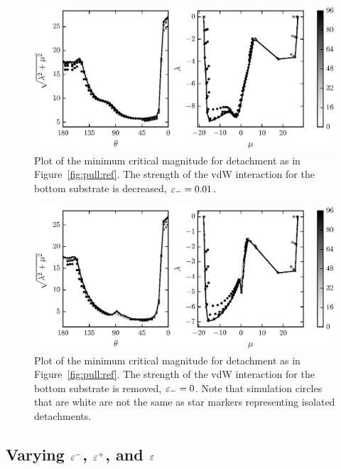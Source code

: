 {   \begin{figure}[t]
      \begin{center}
         \includegraphics{./fig/ch3/pull/eb0.01/grid.eps}
      \end{center}      
      \caption{Plot of the minimum critical magnitude for detachment as in Figure~\ref{fig:pull:ref}. The strength of the vdW interaction for the bottom substrate is decreased, $\varepsilon_-=0.01$. 
      \label{fig:pull:eb0.01}}
   \end{figure}
   
   \begin{figure}[t]
      \begin{center}
         \includegraphics{./fig/ch3/pull/eb0/grid.eps}
      \end{center}      
      \caption{Plot of the minimum critical magnitude for detachment as in Figure~\ref{fig:pull:ref}. The strength of the vdW interaction for the bottom substrate is removed, $\varepsilon_-=0$. Note that simulation circles that are white are not the same as star markers representing isolated detachments.
      \label{fig:pull:eb0}}
   \end{figure}

\subsection{Varying $\varepsilon^-$, $\varepsilon^+$, and $\varepsilon$} \label{section:detachment:eps}

}

